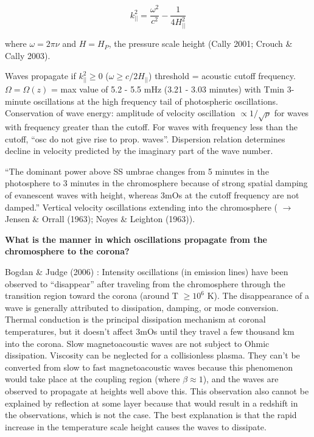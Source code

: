 \begin{equation}
    k_{||}^{2} = \frac{\omega^{2}}{c^{2}} - \frac{1}{4H_{||}^{2}}
\end{equation}

where $\omega = 2\pi\nu$ and $H = H_{P}$,
the pressure scale height
(Cally 2001; Crouch \& Cally 2003).

Waves propagate if
$k_{||}^{2} \ge 0$
($ \omega \ge c/2H_{||} $)
threshold = acoustic cutoff frequency.
$\Omega = \Omega(z)$ = max value of 5.2 - 5.5 mHz (3.21 - 3.03 minutes) with
Tmin 
3-minute oscillations at the high frequency tail of photospheric
oscillations.
Conservation of wave energy: amplitude of velocity oscillation
$\propto 1/\sqrt{\rho}$ for
waves with frequency greater than the cutoff.
For
waves with frequency less than the cutoff,
``osc do not give rise to prop. waves''.
Dispersion relation determines
decline in velocity predicted by the imaginary part of the wave number.

``The dominant power above SS umbrae changes from 5 minutes in the photosphere to
3 minutes in the chromosphere because of strong spatial damping of evanescent
waves with height, whereas 3mOs at the cutoff frequency are not damped.''
Vertical velocity oscillations extending
into the chromosphere
(\cite{Judge2006} $\rightarrow$ Jensen \& Orrall (1963);
Noyes \& Leighton (1963)).



\textbf{What is the manner in which oscillations propagate from the chromosphere
to the corona?}

Bogdan \& Judge (2006)
: Intensity
oscillations (in emission lines) have been observed to ``disappear'' after
traveling from the chromosphere through the transition region toward the corona
(around T $\ge 10^{6}$ K).
The disappearance of a wave is generally attributed to
dissipation, damping, or mode conversion.
Thermal conduction is the principal
dissipation mechanism at coronal temperatures, but it doesn't affect 3mOs
until they travel a few thousand km into the corona.
Slow magnetoacoustic waves are not subject to Ohmic dissipation.
Viscosity can be neglected for a
collisionless plasma. They can’t be converted from slow to fast magnetoacoustic
waves because this phenomenon would take place at the coupling region
(where $\beta \approx 1$),
and the waves are observed to propagate at heights well above this.
This
observation also cannot be explained by reflection at some layer because that
would result in a redshift in the observations, which is not the case.
The best explanation is that the rapid increase in the temperature scale height
causes the waves to dissipate.

